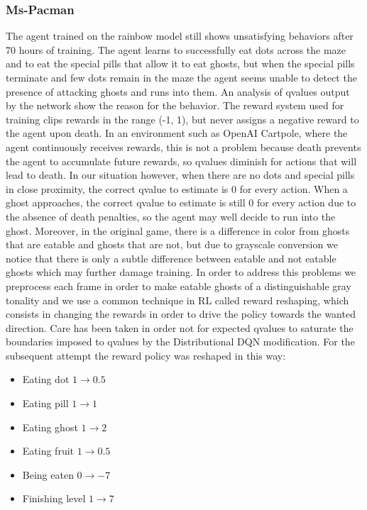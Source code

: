 \documentclass[10pt,twocolumn,letterpaper]{article}
\begin{document}
\subsubsection{Ms-Pacman}
The agent trained on the rainbow model still shows unsatisfying behaviors after 70 hours of training. The agent learns to successfully eat dots across the maze and to eat the special pills that allow it to eat ghosts, but when the special pills terminate and few dots remain in the maze the agent seems unable to detect the presence of attacking ghosts and runs into them.
An analysis of qvalues output by the network show the reason for the behavior. The reward system used for training clips rewards in the range (-1, 1), but never assigns a negative reward to the agent upon death. In an environment such as OpenAI Cartpole, where the agent continuously receives rewards, this is not a problem because death prevents the agent to accumulate future rewards, so qvalues diminish for actions that will lead to death. In our situation however, when there are no dots and special pills in close proximity, the correct qvalue to estimate is 0 for every action. When a ghost approaches, the correct qvalue to estimate is still 0 for every action due to the absence of death penalties, so the agent may well decide to run into the ghost. Moreover, in the original game, there is a difference in color from ghosts that are eatable and ghosts that are not, but due to grayscale conversion we notice that there is only a subtle difference between eatable and not eatable ghosts which may further damage training.
In order to address this problems we preprocess each frame in order to make eatable ghosts of a distinguishable gray tonality and we use a common technique in RL called reward reshaping, which consists in changing the rewards in order to drive the policy towards the wanted direction.
Care has been taken in order not for expected qvalues to saturate the boundaries imposed to qvalues by the Distributional DQN modification. For the subsequent attempt the reward policy was reshaped in this way:
\begin{itemize}
	\item Eating dot $1 \rightarrow 0.5$
	\item Eating pill $1 \rightarrow 1$
	\item Eating ghost $1 \rightarrow 2$
	\item Eating fruit $1 \rightarrow 0.5$
	\item Being eaten $0 \rightarrow -7$
	\item Finishing level $1 \rightarrow 7$
\end{itemize}
\end{document}
